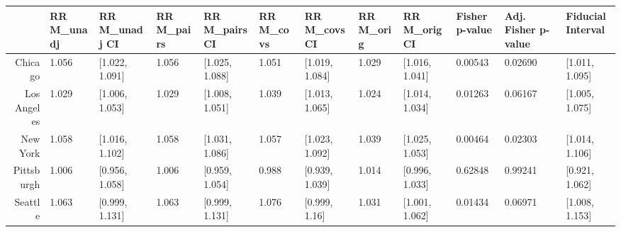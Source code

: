 \begin{table}[ht]
\centering
\begin{tabular}{rlllllllllll}
  \hline
 & RR M\_unadj & RR M\_unadj CI & RR M\_pairs & RR M\_pairs CI & RR M\_covs & RR M\_covs CI & RR M\_orig & RR M\_orig CI & Fisher p-value & Adj. Fisher p-value & Fiducial Interval \\ 
  \hline
Chicago & 1.056 & [1.022, 1.091] & 1.056 & [1.025, 1.088] & 1.051 & [1.019, 1.084] & 1.029 & [1.016, 1.041] & 0.00543 & 0.02690 & [1.011, 1.095] \\ 
  Los Angeles & 1.029 & [1.006, 1.053] & 1.029 & [1.008, 1.051] & 1.039 & [1.013, 1.065] & 1.024 & [1.014, 1.034] & 0.01263 & 0.06167 & [1.005, 1.075] \\ 
  New York & 1.058 & [1.016, 1.102] & 1.058 & [1.031, 1.086] & 1.057 & [1.023, 1.092] & 1.039 & [1.025, 1.053] & 0.00464 & 0.02303 & [1.014, 1.106] \\ 
  Pittsburgh & 1.006 & [0.956, 1.058] & 1.006 & [0.959, 1.054] & 0.988 & [0.939, 1.039] & 1.014 & [0.996, 1.033] & 0.62848 & 0.99241 & [0.921, 1.062] \\ 
  Seattle & 1.063 & [0.999, 1.131] & 1.063 & [0.999, 1.131] & 1.076 & [0.999, 1.16] & 1.031 & [1.001, 1.062] & 0.01434 & 0.06971 & [1.008, 1.153] \\ 
   \hline
\end{tabular}
\end{table}
